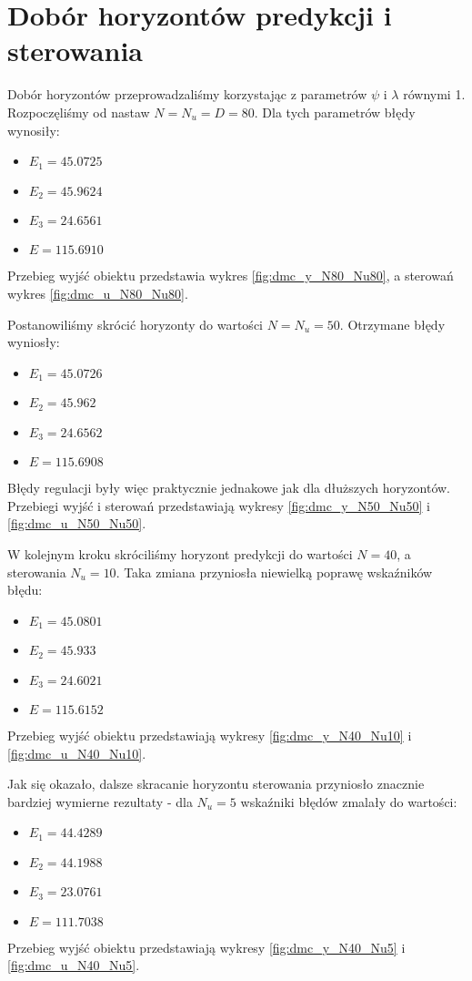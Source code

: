 \section{Dobór horyzontów predykcji i sterowania}
Dobór horyzontów przeprowadzaliśmy korzystając z parametrów $\psi$ i $\lambda$ równymi 1. Rozpoczęliśmy od nastaw $N=N_u=D=80$. Dla tych parametrów błędy wynosiły:
\begin{itemize}
\item $E_1=\num{45,0725}$
\item $E_2=\num{45,9624}$
\item $E_3=\num{24,6561}$
\item $E=\num{115,6910}$
\end{itemize}
Przebieg wyjść obiektu przedstawia wykres \ref{fig:dmc_y_N80_Nu80}, a sterowań wykres \ref{fig:dmc_u_N80_Nu80}.

Postanowiliśmy skrócić horyzonty do wartości $N=N_u=50$. Otrzymane błędy wyniosły:
\begin{itemize}
\item $E_1=\num{45,0726}$
\item $E_2=\num{45,962}$
\item $E_3=\num{24,6562}$
\item $E=\num{115,6908}$
\end{itemize}
Błędy regulacji były więc praktycznie jednakowe jak dla dłuższych horyzontów. Przebiegi wyjść i sterowań przedstawiają wykresy \ref{fig:dmc_y_N50_Nu50} i \ref{fig:dmc_u_N50_Nu50}.

W kolejnym kroku skróciliśmy horyzont predykcji do wartości $N=40$, a sterowania  $N_u=10$. Taka zmiana przyniosła niewielką poprawę wskaźników błędu:
\begin{itemize}
\item $E_1=\num{45,0801}$
\item $E_2=\num{45,933}$
\item $E_3=\num{24,6021}$
\item $E=\num{115,6152}$
\end{itemize}
Przebieg wyjść obiektu przedstawiają wykresy \ref{fig:dmc_y_N40_Nu10} i \ref{fig:dmc_u_N40_Nu10}.

Jak się okazało, dalsze skracanie horyzontu sterowania przyniosło znacznie bardziej wymierne rezultaty - dla $N_u=5$  wskaźniki błędów zmalały do wartości:
\begin{itemize}
\item $E_1=\num{44,4289}$
\item $E_2=\num{44,1988}$
\item $E_3=\num{23,0761}$
\item $E=\num{111,7038}$
\end{itemize}
Przebieg wyjść obiektu przedstawiają wykresy \ref{fig:dmc_y_N40_Nu5} i \ref{fig:dmc_u_N40_Nu5}.

